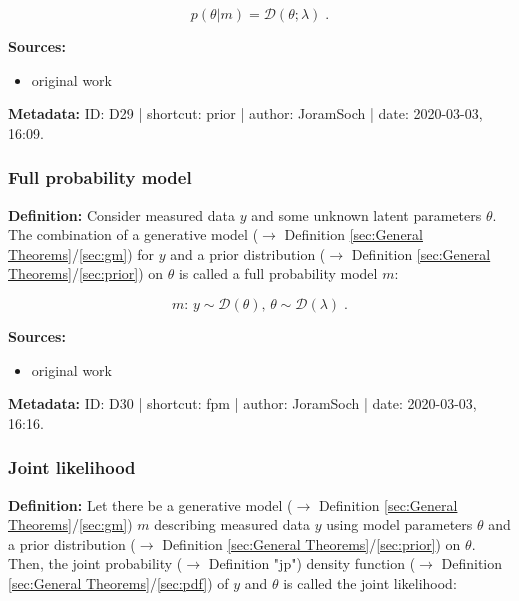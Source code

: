 \documentclass[a4paper,12pt]{book}
\begin{document}
\begin{equation} \label{eq:prior-prior-pdf}
p(\theta|m) = \mathcal{D}(\theta; \lambda) \; .
\end{equation}

\vspace{1em}
\textbf{Sources:}
\begin{itemize}
\item original work\end{itemize}


\vspace{1em}
\textbf{Metadata:} ID: D29 | shortcut: prior | author: JoramSoch | date: 2020-03-03, 16:09.


\subsubsection[\textit{Full probability model}]{Full probability model} \label{sec:fpm}

\vspace{1em}
\textbf{Definition:} Consider measured data $y$ and some unknown latent parameters $\theta$. The combination of a generative model ($\rightarrow$ Definition \ref{sec:General Theorems}/\ref{sec:gm}) for $y$ and a prior distribution ($\rightarrow$ Definition \ref{sec:General Theorems}/\ref{sec:prior}) on $\theta$ is called a full probability model $m$:

\begin{equation} \label{eq:fpm-fpm}
m: \, y \sim \mathcal{D}(\theta), \, \theta \sim \mathcal{D}(\lambda) \; .
\end{equation}

\vspace{1em}
\textbf{Sources:}
\begin{itemize}
\item original work\end{itemize}


\vspace{1em}
\textbf{Metadata:} ID: D30 | shortcut: fpm | author: JoramSoch | date: 2020-03-03, 16:16.


\subsubsection[\textit{Joint likelihood}]{Joint likelihood} \label{sec:jl}

\vspace{1em}
\textbf{Definition:} Let there be a generative model ($\rightarrow$ Definition \ref{sec:General Theorems}/\ref{sec:gm}) $m$ describing measured data $y$ using model parameters $\theta$ and a prior distribution ($\rightarrow$ Definition \ref{sec:General Theorems}/\ref{sec:prior}) on $\theta$. Then, the joint probability ($\rightarrow$ Definition "jp") density function ($\rightarrow$ Definition \ref{sec:General Theorems}/\ref{sec:pdf}) of $y$ and $\theta$ is called the joint likelihood:
\end{document}
